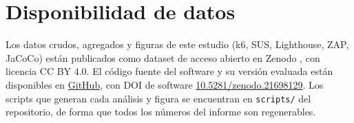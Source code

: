 \documentclass[11pt,a4paper]{report}
\begin{document}
\tableofcontents
\clearpage


\clearpage

\clearpage

\clearpage

\clearpage



\clearpage
\section*{Disponibilidad de datos}

Los datos crudos, agregados y figuras de este estudio (k6, SUS, Lighthouse, ZAP,
JaCoCo) están publicados como dataset de acceso abierto en Zenodo
\cite{dataset_sgroas}, con licencia CC BY 4.0. El código fuente del software y
su versión evaluada están disponibles en
\href{https://github.com/Alxjandr07/SGROAS-ProyectoAppWeb}{GitHub}, con DOI de
software \href{https://doi.org/10.5281/zenodo.21698129}{10.5281/zenodo.21698129}.
Los scripts que generan cada análisis y figura se encuentran en
\texttt{scripts/} del repositorio, de forma que todos los números del informe
son regenerables.

\clearpage
\printbibliography[title={Referencias}]

\nocite{*}
\end{document}
